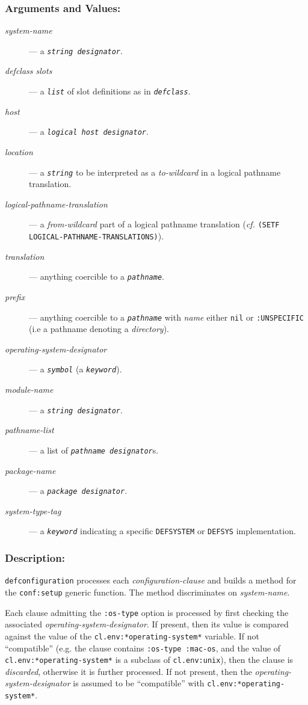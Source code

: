 \documentclass[a4paper]{article}
\newcommand{\defconfiguration}{\texttt{defconfiguration}}
\newcommand{\cfr}{\textit{cf.}}
\newcommand{\code}[1]{\texttt{#1}}
\newcommand{\clobject}[1]{\texttt{\textit{#1}}} %
\newcommand{\clhsterm}[1]{\texttt{\textit{#1}}} %
\begin{document}
\subsubsection*{Arguments and Values:}

\begin{description}
\item[{\emph{system-name}}] --- a \clhsterm{string designator}.
\item[{\emph{defclass slots}}] --- a \clhsterm{list} of slot
	definitions as in \clobject{defclass}.
\item[{\emph{host}}] --- a \clhsterm{logical host designator}.
\item[{\emph{location}}] --- a \clhsterm{string}
	 to be interpreted as a
	\emph{to-wildcard} in a logical pathname translation.
\item[{\emph{logical-pathname-translation}}] --- a
	\emph{from-wildcard} part of a logical pathname translation
	(\cfr{} \code{(SETF LOGICAL-PATHNAME-TRANSLATIONS)}).
\item[{\emph{translation}}] --- anything coercible to a \clhsterm{pathname}.
\item[{\emph{prefix}}] --- anything coercible to a \clhsterm{pathname}
	with \emph{name} either \code{nil} or \code{:UNSPECIFIC} (i.e
	a pathname denoting a \emph{directory}).
\item[{\emph{operating-system-designator}}] --- a \clhsterm{symbol} (a
	\clhsterm{keyword}).
\item[{\emph{module-name}}] --- a \clhsterm{string designator}.
\item[{\emph{pathname-list}}] --- a list of \clhsterm{pathname designator}s.
\item[{\emph{package-name}}] --- a \clhsterm{package designator}.
\item[{\emph{system-type-tag}}] --- a \clhsterm{keyword} indicating a
	specific \code{DEFSYSTEM} or \code{DEFSYS} implementation.
\end{description}


\subsubsection*{Description:}

\defconfiguration{} processes each \emph{configuration-clause} and
builds a method for the \code{conf:setup} generic function.  The
method discriminates on \emph{system-name}.

Each clause admitting the \code{:os-type} option is processed by first
checking the associated \emph{operating-system-designator}. If
present, then its value is compared against the value of the
\code{cl.env:*operating-system*} variable. If not ``compatible''
(e.g. the clause contains \code{:os-type :mac-os}, and the value of
\code{cl.env:*operating-system*} is a subclass of \code{cl.env:unix}),
then the clause is \emph{discarded}, otherwise it is further processed. If
not present, then the \emph{operating-system-designator} is assumed to
be ``compatible'' with \code{cl.env:*operating-system*}.
\end{document}
